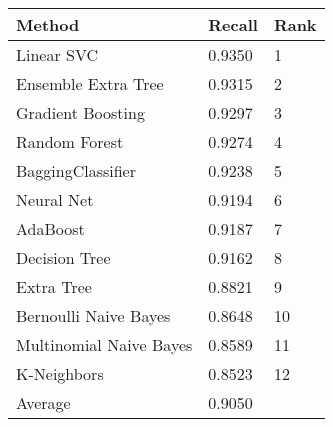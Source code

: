 \begin{tabular}{|l|l|l| }
\hline
Method                  & Recall & Rank \\ \hline
Linear SVC              & 0.9350 & 1\\
Ensemble Extra Tree     & 0.9315 & 2\\
Gradient Boosting       & 0.9297 & 3\\
Random Forest           & 0.9274 & 4\\
BaggingClassifier       & 0.9238 & 5\\
Neural Net              & 0.9194 & 6\\
AdaBoost                & 0.9187 & 7\\
Decision Tree           & 0.9162 & 8\\
Extra Tree              & 0.8821 & 9\\
Bernoulli Naive Bayes   & 0.8648 & 10\\
Multinomial Naive Bayes & 0.8589 & 11\\
K-Neighbors             & 0.8523 & 12\\
Average & 0.9050 & \\
\hline
\end{tabular}